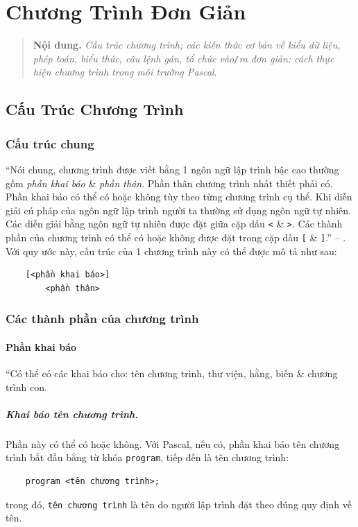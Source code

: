 \documentclass[oneside]{book}
\numberwithin{equation}{section}
\begin{document}

\chapter{Chương Trình Đơn Giản}

\begin{quotation}
	\textbf{Nội dung.} \textit{Cấu trúc chương trình; các kiến thức cơ bản về kiểu dữ liệu, phép toán, biểu thức, câu lệnh gán, tổ chức vào\emph{\texttt{/}}ra đơn giản; cách thực hiện chương trình trong môi trường Pascal}.
\end{quotation}

\section{Cấu Trúc Chương Trình}

\subsection{Cấu trúc chung}
``Nói chung, chương trình được viết bằng 1 ngôn ngữ lập trình bậc cao thường gồm \textit{phần khai báo} \& \textit{phần thân}. Phần thân chương trình nhất thiết phải có. Phần khai báo có thể có hoặc không tùy theo từng chương trình cụ thể. Khi diễn giải cú pháp của ngôn ngữ lập trình người ta thường sử dụng ngôn ngữ tự nhiên. Các diễn giải bằng ngôn ngữ tự nhiên được đặt giữa cặp dấu \verb|<| \& \verb|>|. Các thành phần của chương trình có thể có hoặc không được đặt trong cặp dấu \verb|[| \& \verb|]|.'' -- \cite[p. 18]{SGK_Tin_Hoc_11}. Với quy ước này, cấu trúc của 1 chương trình này có thể được mô tả như sau:
\begin{verbatim}
	[<phần khai báo>]
    	<phần thân>
\end{verbatim}

\subsection{Các thành phần của chương trình}

\subsubsection{Phần khai báo}
``Có thể có các khai báo cho: tên chương trình, thư viện, hằng, biến \& chương trình con.

\paragraph{Khai báo tên chương trình.} Phần này có thể có hoặc không. Với Pascal, nếu có, phần khai báo tên chương trình bắt đầu bằng từ khóa \texttt{program}, tiếp đến là tên chương trình:
\begin{verbatim}
	program	<tên chương trình>;
\end{verbatim}
trong đó, \texttt{tên chương trình} là tên do người lập trình đặt theo đúng quy định về tên.
\end{document}
